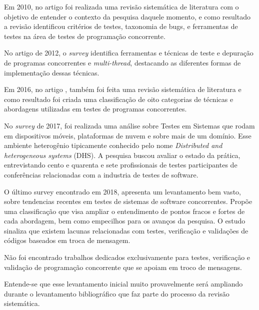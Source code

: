 Em 2010, no artigo \cite{brito_concurrent_2010} foi realizada uma revisão sistemática de literatura com o objetivo de entender o contexto da pesquisa daquele momento, e como resultado a revisão identificou critérios de testes, taxonomia de bugs, e ferramentas de testes na área de testes de programação concorrente. 

No artigo \cite{abdelqawy_survey_2012} de 2012, o \textit{survey} identifica ferramentas e técnicas de teste e depuração de programas concorrentes e \textit{multi-thread}, destacando as diferentes formas de implementação dessas técnicas.

Em 2016, no artigo \cite{arora_systematic_2016}, também foi feita uma revisão sistemática de literatura e como resultado foi criada uma classificação de oito categorias de técnicas e abordagens utilizadas em testes de programas concorrentes. 

No \textit{survey} \cite{lima_survey_2017} de 2017, foi realizada uma análise sobre Testes em Sistemas que rodam em dispositivos móveis, plataformas de nuvem e sobre mais de um domínio. Esse ambiente heterogênio tipicamente conhecido pelo nome  \textit{Distributed and heterogeneous systems} (DHS). A pesquisa buscou avaliar o estado da prática, entrevistando cento e quarenta e sete profissionais de testes participantes de conferências relacionadas com a industria de testes de software.

O último survey encontrado \cite{bianchi_survey_2018} em 2018, apresenta um levantamento bem vasto, sobre tendencias recentes em testes de sistemas de software concorrentes. Propõe uma classificação que visa ampliar o entendimento de pontos fracos e fortes de cada abordagem, bem como empecilhos para os avanços da pesquisa. O estudo sinaliza que existem lacunas relacionadas com testes, verificação e validações de códigos baseados em troca de mensagem. 

Não foi encontrado trabalhos dedicados exclusivamente para testes, verificação e validação de programação concorrente que se apoiam em troco de mensagens.

Entende-se que esse levantamento inicial muito provavelmente será ampliando durante o levantamento bibliográfico que faz parte do processo da revisão sistemática.